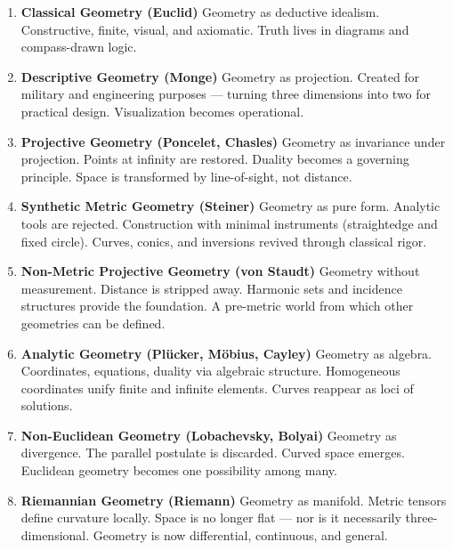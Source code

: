 \documentclass[9pt]{article}
\begin{document}
\begin{enumerate}
  \item \textbf{Classical Geometry (Euclid)}  
  Geometry as deductive idealism. Constructive, finite, visual, and axiomatic. Truth lives in diagrams and compass-drawn logic.\\

  \item \textbf{Descriptive Geometry (Monge)}  
  Geometry as projection. Created for military and engineering purposes — turning three dimensions into two for practical design. Visualization becomes operational.\\

  \item \textbf{Projective Geometry (Poncelet, Chasles)}  
  Geometry as invariance under projection. Points at infinity are restored. Duality becomes a governing principle. Space is transformed by line-of-sight, not distance.\\

  \item \textbf{Synthetic Metric Geometry (Steiner)}  
  Geometry as pure form. Analytic tools are rejected. Construction with minimal instruments (straightedge and fixed circle). Curves, conics, and inversions revived through classical rigor.\\

  \item \textbf{Non-Metric Projective Geometry (von Staudt)}  
  Geometry without measurement. Distance is stripped away. Harmonic sets and incidence structures provide the foundation. A pre-metric world from which other geometries can be defined.\\

  \item \textbf{Analytic Geometry (Plücker, Möbius, Cayley)}  
  Geometry as algebra. Coordinates, equations, duality via algebraic structure. Homogeneous coordinates unify finite and infinite elements. Curves reappear as loci of solutions.\\

  \item \textbf{Non-Euclidean Geometry (Lobachevsky, Bolyai)}  
  Geometry as divergence. The parallel postulate is discarded. Curved space emerges. Euclidean geometry becomes one possibility among many.\\

  \item \textbf{Riemannian Geometry (Riemann)}  
  Geometry as manifold. Metric tensors define curvature locally. Space is no longer flat — nor is it necessarily three-dimensional. Geometry is now differential, continuous, and general.\\


\end{enumerate}
\end{document}
